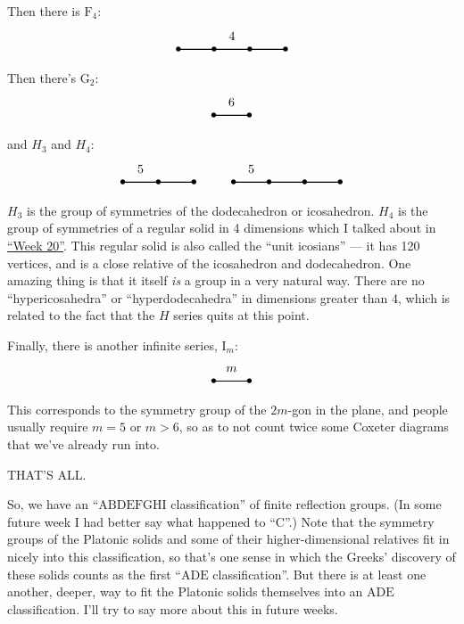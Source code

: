 \documentclass{article}
\begin{document}
Then there is \(\mathrm{F}_4\): \[
  \begin{tikzpicture}
    \draw[thick] (0,0) node{$\bullet$} to (1,0) node{$\bullet$} to node[label=above:{4}]{} (2,0) node{$\bullet$} to (3,0) node {$\bullet$};
  \end{tikzpicture}
\] Then there's \(\mathrm{G}_2\): \[
  \begin{tikzpicture}
    \draw[thick] (0,0) node{$\bullet$} to node[label=above:{6}]{} (1,0) node{$\bullet$};
  \end{tikzpicture}
\] and \(H_3\) and \(H_4\): \[
  \begin{tikzpicture}
    \draw[thick] (0,0) node{$\bullet$} to node[label=above:{5}]{} (1,0) node{$\bullet$} to (2,0) node{$\bullet$};
  \end{tikzpicture}
  \qquad
  \begin{tikzpicture}
  \draw[thick] (0,0) node{$\bullet$} to node[label=above:{5}]{} (1,0) node{$\bullet$} to (2,0) node{$\bullet$} to (3,0) node {$\bullet$};
\end{tikzpicture}
\] \(H_3\) is the group of symmetries of the dodecahedron or
icosahedron. \(H_4\) is the group of symmetries of a regular solid in 4
dimensions which I talked about in \protect\hyperlink{week20}{``Week
20''}. This regular solid is also called the ``unit icosians'' --- it
has 120 vertices, and is a close relative of the icosahedron and
dodecahedron. One amazing thing is that it itself \emph{is} a group in a
very natural way. There are no ``hypericosahedra'' or
``hyperdodecahedra'' in dimensions greater than 4, which is related to
the fact that the \(H\) series quits at this point.

Finally, there is another infinite series, \(\mathrm{I}_m\): \[
  \begin{tikzpicture}
    \draw[thick] (0,0) node{$\bullet$} to node[label=above:{$m$}]{} (1,0) node{$\bullet$};
  \end{tikzpicture}
\] This corresponds to the symmetry group of the \(2m\)-gon in the
plane, and people usually require \(m = 5\) or \(m > 6\), so as to not
count twice some Coxeter diagrams that we've already run into.

THAT'S ALL.

So, we have an ``\(\mathrm{ABDEFGHI}\) classification'' of finite
reflection groups. (In some future week I had better say what happened
to ``\(\mathrm{C}\)''.) Note that the symmetry groups of the Platonic
solids and some of their higher-dimensional relatives fit in nicely into
this classification, so that's one sense in which the Greeks' discovery
of these solids counts as the first ``\(\mathrm{ADE}\) classification''.
But there is at least one another, deeper, way to fit the Platonic
solids themselves into an \(\mathrm{ADE}\) classification. I'll try to
say more about this in future weeks.
\end{document}
